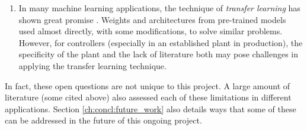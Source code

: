 \begin{enumerate}
    \item In many machine learning applications, the technique of \emph{transfer learning} has shown great promise \cite{transfer_learning_sdc, transfer_learning_cnn}. Weights and architectures from pre-trained models used almost directly, with some modifications, to solve similar problems. However, for controllers (especially in an established plant in production), the specificity of the plant and the lack of literature both may pose challenges in applying the transfer learning technique. 
\end{enumerate}

In fact, these open questions are not unique to this project. A large amount of literature (some cited above) also assessed each of these limitations in different applications. Section \ref{ch:concl:future_work} also details ways that some of these can be addressed in the future of this ongoing project. 